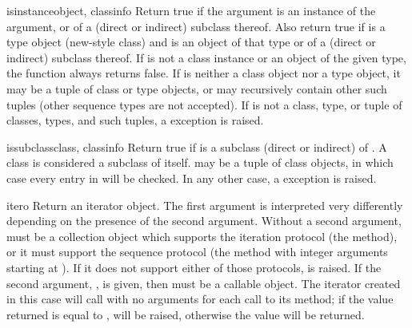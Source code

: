 \begin{funcdesc}{isinstance}{object, classinfo}
  Return true if the  argument is an instance of the
   argument, or of a (direct or indirect) subclass
  thereof.  Also return true if  is a type object
  (new-style class) and  is an object of that type or of a
  (direct or indirect) subclass thereof.  If  is not a
  class instance or an object of the given type, the function always
  returns false.  If  is neither a class object nor a
  type object, it may be a tuple of class or type objects, or may
  recursively contain other such tuples (other sequence types are not
  accepted).  If  is not a class, type, or tuple of
  classes, types, and such tuples, a  exception
  is raised.
\end{funcdesc}

\begin{funcdesc}{issubclass}{class, classinfo}
  Return true if  is a subclass (direct or indirect) of
  .  A class is considered a subclass of itself.
   may be a tuple of class objects, in which case every
  entry in  will be checked. In any other case, a
   exception is raised.
\end{funcdesc}

\begin{funcdesc}{iter}{o}
  Return an iterator object.  The first argument is interpreted very
  differently depending on the presence of the second argument.
  Without a second argument,  must be a collection object which
  supports the iteration protocol (the  method), or
  it must support the sequence protocol (the 
  method with integer arguments starting at ).  If it does not
  support either of those protocols,  is raised.
  If the second argument, , is given, then  must
  be a callable object.  The iterator created in this case will call
   with no arguments for each call to its 
  method; if the value returned is equal to ,
   will be raised, otherwise the value will
  be returned.
\end{funcdesc}

